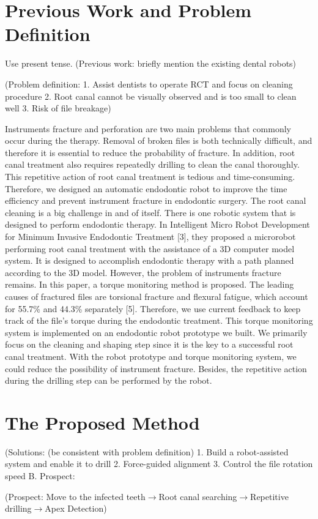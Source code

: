 \section{Previous Work and Problem Definition}
Use present tense.
(Previous work: briefly mention the existing dental robots)
\par\noindent
(Problem definition:
1.	Assist dentists to operate RCT and focus on cleaning procedure
2.	Root canal cannot be visually observed and is too small to clean well
3.	Risk of file breakage)		
\par\noindent
Instruments fracture and perforation are two main problems that commonly occur during the therapy. Removal of broken files is both technically difficult, and therefore it is essential to reduce the probability of fracture. In addition, root canal treatment also requires repeatedly drilling to clean the canal thoroughly.  This repetitive action of root canal treatment is tedious and time-consuming. Therefore, we designed an automatic endodontic robot to improve the time efficiency and prevent instrument fracture in endodontic surgery.
The root canal cleaning is a big challenge in and of itself.
There is one robotic system that is designed to perform endodontic therapy. In Intelligent Micro Robot Development for Minimum Invasive Endodontic Treatment [3], they proposed a microrobot performing root canal treatment with the assistance of a 3D computer model system. It is designed to accomplish endodontic therapy with a path planned according to the 3D model. However, the problem of instruments fracture remains. 
In this paper, a torque monitoring method is proposed. The leading causes of fractured files are torsional fracture and flexural fatigue, which account for 55.7\% and 44.3\% separately [5]. Therefore, we use current feedback to keep track of the file's torque during the endodontic treatment. This torque monitoring system is implemented on an endodontic robot prototype we built. We primarily focus on the cleaning and shaping step since it is the key to a successful root canal treatment. With the robot prototype and torque monitoring system, we could reduce the possibility of instrument fracture. Besides, the repetitive action during the drilling step can be performed by the robot.		
\section{The Proposed Method}
(Solutions: (be consistent with problem definition)
1.	Build a robot-assisted system and enable it to drill
2.	Force-guided alignment 
3.	Control the file rotation speed
B.	Prospect:
\par\noindent
(Prospect: Move to the infected teeth$\longrightarrow $Root canal searching$\longrightarrow $Repetitive drilling$\longrightarrow $Apex Detection)						
